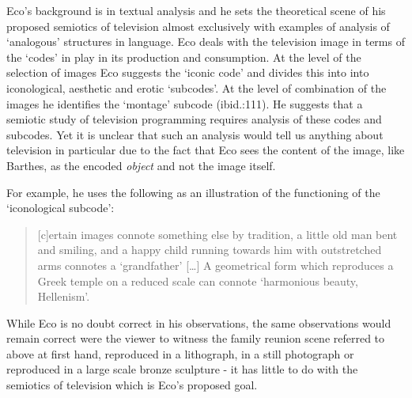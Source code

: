 Eco's background is in textual analysis and he sets the theoretical scene of his proposed semiotics of television almost exclusively with examples of analysis of `analogous' structures in language. Eco deals with the television image in terms of the `codes' in play in its production and consumption. At the level of the selection of images Eco suggests the `iconic code' and divides this into into iconological, aesthetic and erotic `subcodes'.  At the level of combination of the images he identifies the `montage' subcode (ibid.:111). He suggests that a semiotic study of television programming requires analysis of these codes and subcodes. Yet it is unclear that such an analysis would tell us anything about television in particular due to the fact that Eco sees the content of the image, like Barthes, as the encoded \textit{object} and not the image itself.

For example, he uses the following as an illustration of the functioning of the `iconological subcode':


\begin{quote}
[c]ertain images connote something else by tradition, a little old man bent and smiling, and a happy child running towards him with outstretched arms connotes a `grandfather' [\ldots] A geometrical form which reproduces a Greek temple on a reduced scale can connote `harmonious beauty, Hellenism'. \citep[112]{Eco:1965}
\end{quote}

While Eco is no doubt correct in his observations, the same observations would remain correct were the viewer to witness the family reunion scene referred to above at first hand, reproduced in a lithograph, in a still photograph or reproduced in a large scale bronze sculpture  - it has little to do with the semiotics of television which is Eco's proposed goal. 

